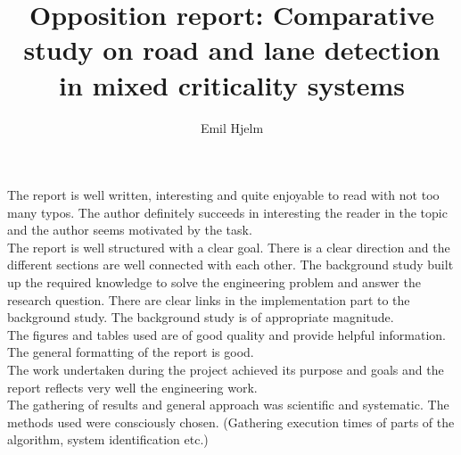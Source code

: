 \documentclass{article}
\title{Opposition report: Comparative study on road and lane detection in mixed criticality systems}
\author{Emil Hjelm}
\begin{document}
\maketitle

The report is well written, interesting and quite enjoyable to read with not too many typos. The author definitely succeeds in interesting the reader in the topic and the author seems motivated by the task.\\

The report is well structured with a clear goal. There is a clear direction and the different sections are well connected with each other. The background study built up the required knowledge to solve the engineering problem and answer the research question. There are clear links in the implementation part to the background study. The background study is of appropriate magnitude.\\

The figures and tables used are of good quality and provide helpful information.\\

The general formatting of the report is good.\\

The work undertaken during the project achieved its purpose and goals and the report reflects very well the engineering work.\\



The gathering of results and general approach was scientific and systematic. The methods used were consciously chosen. (Gathering execution times of parts of the algorithm, system identification etc.)\\




\end{document}
